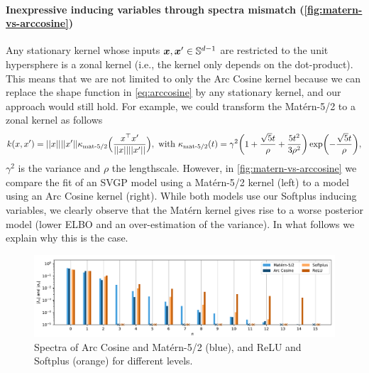 \paragraph{Inexpressive inducing variables through spectra mismatch (\cref{fig:matern-vs-arccosine})} Any stationary kernel whose inputs $\bm{x},\bm{x}' \in \mathbb{S}^{d-1}$ are restricted to the unit hypersphere is a zonal kernel (i.e., the kernel only depends on the dot-product). This means that we are not limited to only the Arc Cosine kernel because we can replace the shape function in \cref{eq:arccosine} by any stationary kernel, and our approach would still hold. For example, we could transform the Mat\'ern-5/2 to a zonal kernel as follows
\begin{equation*}
    k(x, x') = \norm{x} \norm{x'} \kappa_{\text{mat-5/2}}\Big(\frac{x^\top x'}{\norm{x}\norm{x'}}\Big),\ \text{with}\ \kappa_{\text{mat-5/2}}(t) = \gamma ^{2}\left(1+{\frac {{\sqrt {5}} t}{\rho }}+{\frac {5 t^{2}}{3\rho ^{2}}}\right)\exp \left(-{\frac {{\sqrt {5}} t}{\rho }}\right),
\end{equation*}
$\gamma^2$ is the variance and $\rho$ the lengthscale. However, in \cref{fig:matern-vs-arccosine} we compare the fit of an SVGP model using a Mat\'ern-5/2 kernel (left) to a model using an Arc Cosine kernel (right). While both models use our Softplus inducing variables, we clearly observe that the Mat\'ern kernel gives rise to a worse posterior model (lower ELBO and an over-estimation of the variance). In what follows we explain why this is the case.

\begin{figure}[t]
    \centering
    \includegraphics[width=\linewidth]{spectra_kernels_and_activations.pdf}
    \caption{Spectra of Arc Cosine and Mat\'ern-5/2 (blue), and ReLU and Softplus (orange) for different levels.}
    \label{fig:spectra}
\end{figure}

